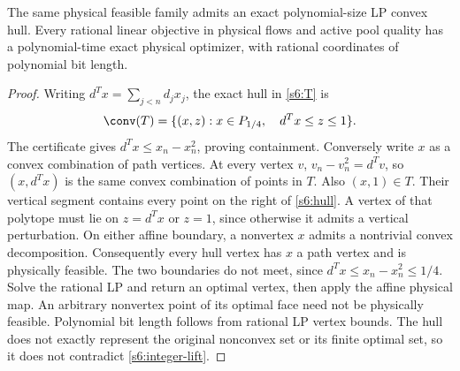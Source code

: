 \begin{theorem}\label{s6:lp-hull}
The same physical feasible family admits an exact polynomial-size LP
convex hull. Every rational linear objective in physical flows and active
pool quality has a polynomial-time exact physical optimizer, with rational
coordinates of polynomial bit length.
\end{theorem}
\begin{proof}
Writing $d^Tx=\sum_{j<n}d_jx_j$, the exact hull in \eqref{s6:T} is
\begin{equation}
 \conv(T)=\{(x,z):x\in P_{1/4},\quad d^Tx\le z\le1\}.
 \label{s6:hull}
\end{equation}
The certificate gives $d^Tx\le x_n-x_n^2$, proving containment.
Conversely write $x$ as a convex combination of path vertices.
At every vertex $v$, $v_n-v_n^2=d^Tv$, so $(x,d^Tx)$ is the same
convex combination of points in $T$. Also $(x,1)\in T$. Their vertical
segment contains every point on the right of \eqref{s6:hull}.
A vertex of that polytope must lie on $z=d^Tx$ or $z=1$, since otherwise
it admits a vertical perturbation. On either affine boundary, a nonvertex
$x$ admits a nontrivial convex decomposition. Consequently every hull
vertex has $x$ a path vertex and is physically feasible. The two
boundaries do not meet, since $d^Tx\le x_n-x_n^2\le1/4$.
Solve the rational LP and return an optimal vertex, then apply the affine
physical map. An arbitrary nonvertex point of its optimal face need not
be physically feasible. Polynomial bit length follows from rational LP
vertex bounds. The hull does not exactly represent the original
nonconvex set or its finite optimal set, so it does not contradict
\cref{s6:integer-lift}.
\end{proof}

